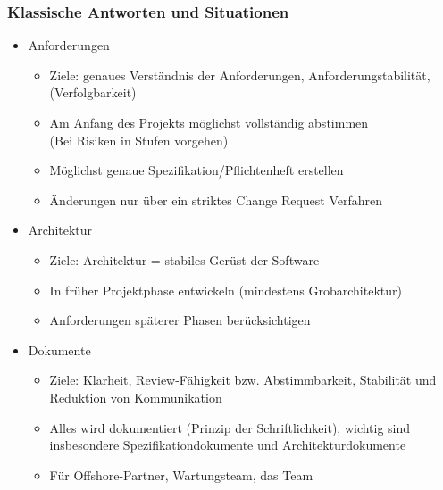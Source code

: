 \frame
{
  \frametitle{Klassische Antworten und Situationen}
  \begin{itemize}
    \item{Anforderungen
      \begin{itemize}
      \item{Ziele: genaues Verständnis der Anforderungen, Anforderungstabilität, (Verfolgbarkeit) }
      \item{Am Anfang des Projekts möglichst vollständig abstimmen \\(Bei Risiken in Stufen vorgehen)}
      \item{Möglichst genaue Spezifikation/Pflichtenheft erstellen}
      \item{Änderungen nur über ein striktes Change Request Verfahren}
      \end{itemize}
    }
    \item{Architektur
      \begin{itemize}
      \item{Ziele: Architektur = stabiles Gerüst der Software}
      \item{In früher Projektphase entwickeln (mindestens Grobarchitektur)}
      \item{Anforderungen späterer Phasen berücksichtigen}
      \end{itemize}
    }
    \item{Dokumente
      \begin{itemize}
      \item{Ziele: Klarheit, Review-Fähigkeit bzw. Abstimmbarkeit, Stabilität und Reduktion von Kommunikation}
      \item{Alles wird dokumentiert (Prinzip der Schriftlichkeit), wichtig sind insbesondere Spezifikationdokumente und Architekturdokumente}
      \item{Für Offshore-Partner, Wartungsteam, das Team}
      \end{itemize}
    }
  \end{itemize}
}


